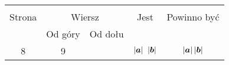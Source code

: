\documentclass[a4paper,11pt]{article}
\begin{document}

\begin{center}
  \begin{tabular}{|c|c|c|c|c|}
    \hline
    & \multicolumn{2}{c|}{} & & \\
    Strona & \multicolumn{2}{c|}{Wiersz} & Jest
                              & Powinno być \\ \cline{2-3}
    & Od góry & Od dołu & & \\
    \hline
    8   &  9 & & $| \boldsymbol{a} | \;\; | \boldsymbol{b} |$ & $| \boldsymbol{a} | \, | \boldsymbol{b} |$ \\
    \hline
  \end{tabular}
\end{center}

\vspace{\spaceTwo}









\end{document}
